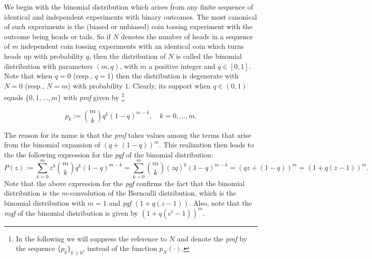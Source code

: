 \documentclass[]{book}
\let\rmarkdownfootnote\footnote%
\def\footnote{\protect\rmarkdownfootnote}
\theoremstyle{definition}
\theoremstyle{definition}
\theoremstyle{definition}
\theoremstyle{remark}
\begin{document}
We begin with the binomial distribution which arises from any finite
sequence of identical and independent experiments with binary outcomes.
The most canonical of such experiments is the (biased or unbiased) coin
tossing experiment with the outcome being heads or tails. So if \(N\)
denotes the number of heads in a sequence of \(m\) independent coin
tossing experiments with an identical coin which turns heads up with
probability \(q\), then the distribution of \(N\) is called the binomial
distribution with parameters \((m,q)\), with \(m\) a positive integer
and \(q\in[0,1]\). Note that when \(q=0\) (resp., \(q=1\)) then the
distribution is degenerate with \(N=0\) (resp., \(N=m\)) with
probability \(1\). Clearly, its support when \(q\in(0,1)\) equals
\(\{0,1,\ldots,m\}\) with \emph{pmf} given by \footnote{In the following
  we will suppress the reference to \(N\) and denote the \emph{pmf} by
  the sequence \(\{p_k\}_{k\geq 0}\), instead of the function
  \(p_N(\cdot)\).}

\begin{equation*}
p_k:= \binom{m}{k} q^k (1-q)^{m-k}, \quad k=0,\ldots,m.
\end{equation*}

The reason for its name is that the \emph{pmf} takes values among the
terms that arise from the binomial expansion of \((q +(1-q))^m\). This
realization then leads to the the following expression for the
\emph{pgf} of the binomial distribution: \[
P(z):= \sum_{k=0}^m z^k \binom{m}{k} q^k (1-q)^{m-k} = \sum_{k=0}^m  \binom{m}{k} (zq)^k (1-q)^{m-k} = (qz+(1-q))^m = (1+q(z-1))^m.
\] Note that the above expression for the \emph{pgf} confirms the fact
that the binomial distribution is the \(m\)-convolution of the Bernoulli
distribution, which is the binomial distribution with \(m=1\) and
\emph{pgf} \((1+q(z-1))\). Also, note that the \emph{mgf} of the
binomial distribution is given by \((1+q(e^t-1))^m\).
\end{document}
